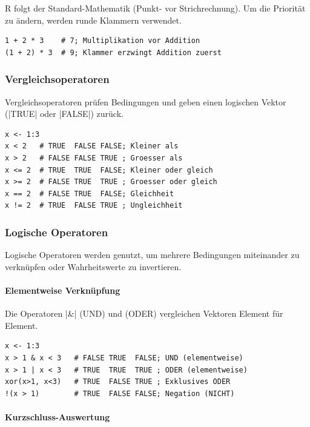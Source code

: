 \documentclass[10pt,twocolumn]{scrartcl}
\renewcommand{\lstinline}{\mycoloredinline}
\begin{document}
R folgt der Standard-Mathematik (Punkt- vor Strichrechnung). Um die Priorität zu ändern, werden runde Klammern verwendet.

\begin{lstlisting}
1 + 2 * 3    # 7; Multiplikation vor Addition
(1 + 2) * 3  # 9; Klammer erzwingt Addition zuerst
\end{lstlisting}

\subsubsection{Vergleichsoperatoren}

Vergleichsoperatoren prüfen Bedingungen und geben einen logischen Vektor (\lstinline|TRUE| oder \lstinline|FALSE|) zurück.

\begin{lstlisting}
x <- 1:3
x < 2   # TRUE  FALSE FALSE; Kleiner als
x > 2   # FALSE FALSE TRUE ; Groesser als
x <= 2  # TRUE  TRUE  FALSE; Kleiner oder gleich
x >= 2  # FALSE TRUE  TRUE ; Groesser oder gleich
x == 2  # FALSE TRUE  FALSE; Gleichheit
x != 2  # TRUE  FALSE TRUE ; Ungleichheit
\end{lstlisting}

\subsubsection{Logische Operatoren}

Logische Operatoren werden genutzt, um mehrere Bedingungen miteinander zu verknüpfen oder Wahrheitswerte zu invertieren.

\paragraph{Elementweise Verknüpfung}

Die Operatoren \lstinline|&| (UND) und \lstinline{|} (ODER) vergleichen Vektoren Element für Element.

\begin{lstlisting}
x <- 1:3
x > 1 & x < 3   # FALSE TRUE  FALSE; UND (elementweise)
x > 1 | x < 3   # TRUE  TRUE  TRUE ; ODER (elementweise)
xor(x>1, x<3)   # TRUE  FALSE TRUE ; Exklusives ODER
!(x > 1)        # TRUE  FALSE FALSE; Negation (NICHT)
\end{lstlisting}

\paragraph{Kurzschluss-Auswertung}
\end{document}
